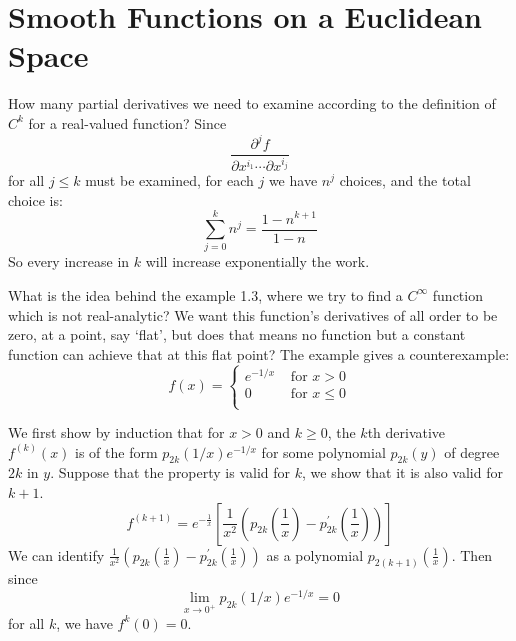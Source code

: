 \section{Smooth Functions on a Euclidean Space}

How many partial derivatives we need to examine according to the definition of $C^{k}$ for a real-valued function? Since $$
\frac{\partial^j f}{\partial x^{i_1}\cdots\partial x^{i_j}}
$$
for all $j\le k$ must be examined, for each $j$ we have $n^j$ choices, and the total choice is:
$$
\sum_{j=0}^{k}n^{j}=\frac{1-n^{k+1}}{1-n}
$$
So every increase in $k$ will increase exponentially the work.

What is the idea behind the example 1.3, where we try to find a $C^{\infty}$ function which is not real-analytic? We want this function's derivatives of all order to be zero, at a point, say ‘flat', but does that means no function but a constant function can achieve that at this flat point? The example gives a counterexample:
$$
f(x)=\left\{\begin{aligned}
e^{-1/x}&\text{ for }x>0\\
0&\text{ for }x\le 0\\
\end{aligned}\right.
$$ 

We first show by induction that for $x>0$ and $k\ge 0$, the $k$th derivative $f^{(k)}(x)$ is of the form $p_{2k}(1/x)e^{-1/x}$ for some polynomial $p_{2k}(y)$ of degree $2k$ in $y$. Suppose that the property is valid for $k$, we show that it is also valid for $k+1$.
$$
f^{(k+1)}=e^{-\frac{1}{x}}\left[\frac{1}{x^2}\left(p_{2k}(\frac{1}{x})-p_{2k}^{'}(\frac{1}{x})\right)\right]
$$
We can identify $\frac{1}{x^2}\left(p_{2k}(\frac{1}{x})-p_{2k}^{'}(\frac{1}{x})\right)$ as a polynomial $p_{2(k+1)}(\frac{1}{x})$. Then since $$
\lim\limits_{x\to 0^{+}}p_{2k}(1/x)e^{-1/x}=0
$$
for all $k$, we have $f^{k}(0)=0$.